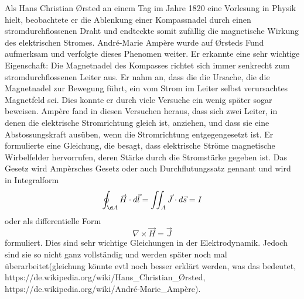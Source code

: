 Als Hans Christian Ørsted an einem Tag im Jahre 1820 eine Vorlesung in Physik hielt, beobachtete er die Ablenkung einer Kompassnadel durch einen stromdurchflossenen Draht und endteckte somit zufällig die magnetische Wirkung des elektrischen Stromes.
André-Marie Ampère wurde auf Ørsteds Fund aufmerksam und verfolgte dieses Phenomen weiter.
Er erkannte eine sehr wichtige Eigenschaft: Die Magnetnadel des Kompasses richtet sich immer senkrecht zum stromdurchflossenen Leiter aus.
Er nahm an, dass die die Ursache, die die Magnetnadel zur Bewegung führt, ein vom Strom im Leiter selbst verursachtes Magnetfeld sei.
Dies konnte er durch viele Versuche ein wenig später sogar beweisen.
Ampère fand in diesen Versuchen heraus, dass sich zwei Leiter, in denen die elektrische Stromrichtung gleich ist, anziehen, und dass sie eine Abstossungskraft ausüben, wenn die Stromrichtung entgegengesetzt ist.
Er formulierte eine Gleichung, die besagt, dass elektrische Ströme magnetische Wirbelfelder hervorrufen, deren Stärke durch die Stromstärke gegeben ist.
Das Gesetz wird Ampèrsches Gesetz oder auch Durchflutungssatz gennant und wird in Integralform
\[
\oint_{\d A}
\vec{H}
\cdot
d\vec{l}
=
\iint_{A}
\vec{J}
\cdot
d\vec{s}
=
I
\]
oder als differentielle Form
\[
\nabla
\times
\vec{H}
=
\vec{J}
\]
formuliert.
Dies sind sehr wichtige Gleichungen in der Elektrodynamik.
Jedoch sind sie so nicht ganz vollständig und werden später noch mal überarbeitet(gleichung könnte evtl noch besser erklärt werden, was das bedeutet, https://de.wikipedia.org/wiki/Hans\_Christian\_Ørsted, https://de.wikipedia.org/wiki/André-Marie\_Ampère).


